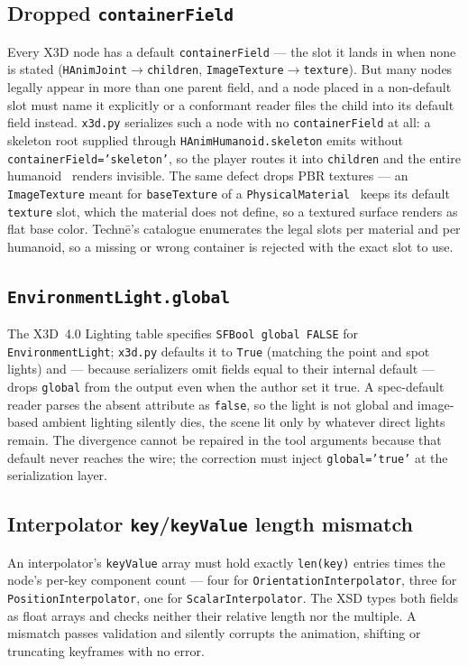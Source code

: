 \documentclass[sigconf,nonacm,screen,anonymous]{acmart}
\begin{document}
\subsection{Dropped \texttt{containerField}}
Every X3D node has a default \texttt{containerField} --- the slot it lands in when none is stated (\texttt{HAnimJoint}$\to$\texttt{children}, \texttt{ImageTexture}$\to$\texttt{texture}). But many nodes legally appear in more than one parent field, and a node placed in a non-default slot must name it explicitly or a conformant reader files the child into its default field instead. \texttt{x3d.py} serializes such a node with no \texttt{containerField} at all: a skeleton root supplied through \texttt{HAnimHumanoid.skeleton} emits without \texttt{containerField='skeleton'}, so the player routes it into \texttt{children} and the entire humanoid~\cite{hanim} renders invisible. The same defect drops PBR textures --- an \texttt{ImageTexture} meant for \texttt{baseTexture} of a \texttt{PhysicalMaterial}~\cite{gltf} keeps its default \texttt{texture} slot, which the material does not define, so a textured surface renders as flat base color. Technē's catalogue enumerates the legal slots per material and per humanoid, so a missing or wrong container is rejected with the exact slot to use.

\subsection{\texttt{EnvironmentLight.global}}
The X3D~4.0 Lighting table specifies \texttt{SFBool global FALSE} for \texttt{EnvironmentLight}; \texttt{x3d.py} defaults it to \texttt{True} (matching the point and spot lights) and --- because serializers omit fields equal to their internal default --- drops \texttt{global} from the output even when the author set it true. A spec-default reader parses the absent attribute as \texttt{false}, so the light is not global and image-based ambient lighting silently dies, the scene lit only by whatever direct lights remain. The divergence cannot be repaired in the tool arguments because that default never reaches the wire; the correction must inject \texttt{global='true'} at the serialization layer.

\subsection{Interpolator \texttt{key}/\texttt{keyValue} length mismatch}
An interpolator's \texttt{keyValue} array must hold exactly \texttt{len(key)} entries times the node's per-key component count --- four for \texttt{OrientationInterpolator}, three for \texttt{PositionInterpolator}, one for \texttt{ScalarInterpolator}. The XSD types both fields as float arrays and checks neither their relative length nor the multiple. A mismatch passes validation and silently corrupts the animation, shifting or truncating keyframes with no error.
\end{document}

